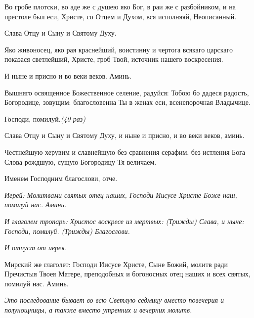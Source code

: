 
\normalfont{}Во гробе плотски, во аде же с душею яко Бог, в раи же с разбойником, и на престоле был еси, Христе, со Отцем и Духом, вся исполняяй, Неописанный. 



Слава Отцу и Сыну и Святому Духу.



Яко живоносец, яко рая краснейший, воистинну и чертога всякаго царскаго показася светлейший, Христе, гроб Твой, источник нашего воскресения. 



И ныне и присно и во веки веков. Аминь.



Вышняго освященное Божественное селение, радуйся: Тобою бо дадеся радость, Богородице, зовущим: благословенна Ты в женах еси, всенепорочная Владычице. 



Господи, помилуй.\itshape  (40 раз\normalfont{}) 



Слава Отцу и Сыну и Святому Духу, и ныне и присно, и во веки веков, аминь. 



Честнейшую херувим и славнейшую без сравнения серафим, без истления Бога Слова рождшую, сущую Богородицу Тя величаем. 



Именем Господним благослови, отче. 

\itshape Иерей\normalfont{}: Молитвами святых отец наших, Господи Иисусе Христе Боже наш, помилуй нас. Аминь. 

\itshape И глаголем тропарь:\normalfont{}
Христос воскресе из мертвых: \itshape (Трижды\normalfont{}) Слава, и ныне: Господи, помилуй. (\itshape Трижды\normalfont{}) Благослови. 

\itshape И отпуст от иерея. 



Мирский же глаголе\normalfont{}т: Господи Иисусе Христе, Сыне Божий, молитв ради Пречистыя Твоея Матере, преподобных и богоносных отец наших и всех святых, помилуй нас. Аминь. 





\itshape  *Это последование бывает во всю Светлую седмицу вместо повечерия и полунощницы, а также вместо утренних и вечерних молитв.\normalfont{}

\mychapterending
